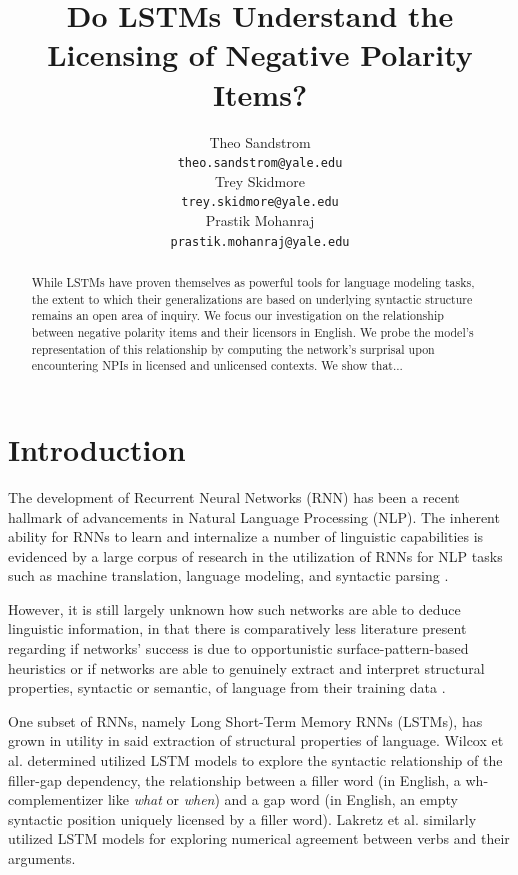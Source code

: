 \documentclass[11pt, round]{article}
\title{Do LSTMs Understand the Licensing of Negative Polarity Items?}
\author{Theo Sandstrom \\
  \texttt{theo.sandstrom@yale.edu} \\
  Trey Skidmore \\
  \texttt{trey.skidmore@yale.edu} \\
  Prastik Mohanraj \\
  \texttt{prastik.mohanraj@yale.edu}}
\begin{document}
\maketitle

\begin{abstract}
While LSTMs have proven themselves as powerful tools for language modeling tasks, the extent to which their generalizations are based on underlying syntactic structure remains an open area of inquiry. We focus our investigation on the relationship between negative polarity items and their licensors in English. We probe the model's representation of this relationship by computing the network's surprisal upon encountering NPIs in licensed and unlicensed contexts. We show that...
\end{abstract}

\section{Introduction}

The development of Recurrent Neural Networks (RNN) has been a recent hallmark of advancements in Natural Language Processing (NLP). The inherent ability for RNNs to learn and internalize a number of linguistic capabilities is evidenced by a large corpus of research in the utilization of RNNs for NLP tasks such as machine translation, language modeling, and syntactic parsing \cite{wilcox-etal-2018-rnn}. 

However, it is still largely unknown how such networks are able to deduce linguistic information, in that there is comparatively less literature present regarding if networks' success is due to opportunistic surface-pattern-based heuristics or if networks are able to genuinely extract and interpret structural properties, syntactic or semantic, of language from their training data \cite{lakretz2019emergence}.

One subset of RNNs, namely Long Short-Term Memory RNNs (LSTMs), has grown in utility in said extraction of structural properties of language. Wilcox et al.  determined utilized LSTM models to explore the syntactic relationship of the filler-gap dependency, the relationship between a filler word (in English, a wh- complementizer like \textit{what} or \textit{when}) and a gap word (in English, an empty syntactic position uniquely licensed by a filler word). Lakretz et al.  similarly utilized LSTM models for exploring numerical agreement between verbs and their arguments. 
\end{document}
